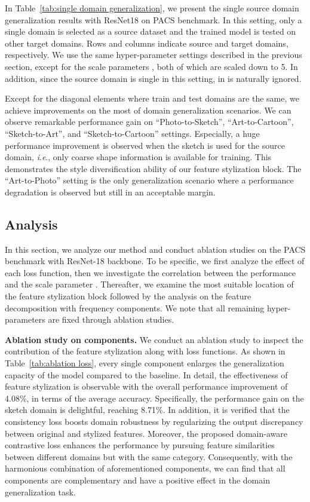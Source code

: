 \documentclass[sigconf]{acmart}
\newcommand{\ie}{\textit{i}.\textit{e}.}
\newcommand{\Tref}[1]{Table~\ref{#1}}
\begin{document}
In \Tref{tab:single domain generalization}, we present the single source domain generalization results with ResNet18 on PACS benchmark.
In this setting, only a single domain is selected as a source dataset and the trained model is tested on other target domains.
Rows and columns indicate source and target domains, respectively.
We use the same hyper-parameter settings described in the previous section, except for the scale parameters ,  both of which are scaled down to 5. In addition, since the source domain is single in this setting,  in  is naturally ignored.

Except for the diagonal elements where train and test domains are the same, we achieve improvements on the most of domain generalization scenarios. We can observe remarkable performance gain on ``Photo-to-Sketch'', ``Art-to-Cartoon'', ``Sketch-to-Art'', and ``Sketch-to-Cartoon'' settings. Especially, a huge performance improvement is observed when the sketch is used for the source domain, \ie, only coarse shape information is available for training. This demonstrates the style diversification ability of our feature stylization block.
The ``Art-to-Photo'' setting is the only generalization scenario where a performance degradation is observed but still in an acceptable margin.

\subsection{Analysis}
\label{sec:analysis}
In this section, we analyze our method and conduct ablation studies on the PACS benchmark with ResNet-18 backbone. To be specific, we first analyze the effect of each loss function, then we investigate the correlation between the performance and the scale parameter . Thereafter, we examine the most suitable location of the feature stylization block followed by the analysis on the feature decomposition with frequency components. We note that all remaining hyper-parameters are fixed through ablation studies.

\textbf{Ablation study on components.}
We conduct an ablation study to inspect the contribution of the feature stylization along with loss functions. As shown in Table~\ref{tab:ablation loss}, every single component enlarges the generalization capacity of the model compared to the baseline. In detail, the effectiveness of feature stylization is observable with the overall performance improvement of 4.08\%, in terms of the average accuracy. Specifically, the performance gain on the sketch domain is delightful, reaching 8.71\%. In addition, it is verified that the consistency loss boosts domain robustness by regularizing the output discrepancy between original and stylized features. Moreover, the proposed domain-aware contrastive loss enhances the performance by pursuing feature similarities between different domains but with the same category. Consequently, with the harmonious combination of aforementioned components, we can find that all components are complementary and have a positive effect in the domain generalization task.
\end{document}
